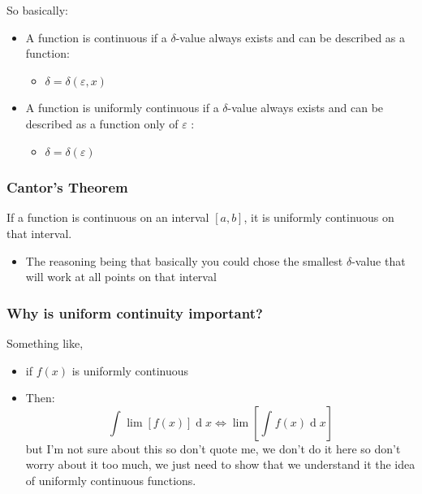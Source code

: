 \documentclass[class=article, crop=false]{standalone}
\begin{document}
So basically:

\begin{itemize}
\item
  A function is continuous if a \(\delta\)-value always exists and can
  be described as a function:

  \begin{itemize}
  \item
    \(\delta = \delta\left( \varepsilon, x \right) \)
  \end{itemize}
\item
  A function is uniformly continuous if a \(\delta\)-value always exists
  and can be described as a function only of \(\varepsilon\) :

  \begin{itemize}
  \item
    \(\delta = \delta\left( \varepsilon \right) \)
  \end{itemize}
\end{itemize}

\hypertarget{cantors-theorem}{%
\subsubsection{Cantor's Theorem}\label{cantors-theorem}}

If a function is continuous on an interval \(\left[ a,b \right] \), it
is uniformly continuous on that interval.

\begin{itemize}

\item
  The reasoning being that basically you could chose the smallest
  \(\delta\)-value that will work at all points on that interval
\end{itemize}

\hypertarget{why-is-uniform-continuity-important}{%
\subsubsection{Why is uniform continuity
important?}\label{why-is-uniform-continuity-important}}

Something like,

\begin{itemize}

\item
  if \(f\left( x \right) \) is uniformly continuous
\item
  Then: \[
  \int^{}_{} \lim_{}\left[ f\left( x \right)  \right]   \operatorname{d}x \iff \lim_{}\left[ \int^{}_{} f\left( x \right)   \operatorname{d}x  \right]
  \] but I'm not sure about this so don't quote me, we don't do it here
  so don't worry about it too much, we just need to show that we
  understand it the idea of uniformly continuous functions.
\end{itemize}
\end{document}

